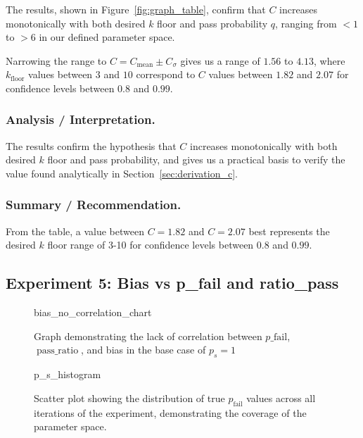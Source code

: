     The results, shown in Figure~\ref{fig:graph_table}, confirm that $C$ increases monotonically with both desired $k$ floor and pass probability $q$, ranging from $< 1$ to $> 6$ in our defined parameter space.

    Narrowing the range to $C = C_{\text{mean}} \pm C_{\sigma}$ gives us a range of $1.56$ to $4.13$, where $k_{\text{floor}}$ values between $3$ and $10$ correspond to $C$ values between $1.82$ and $2.07$ for confidence levels between $0.8$ and $0.99$.

    \subsubsection{Analysis / Interpretation.}

    The results confirm the hypothesis that $C$ increases monotonically with both desired $k$ floor and pass probability, and gives us a practical basis to verify the value found analytically in Section~\ref{sec:derivation_c}.

    \subsubsection{Summary / Recommendation.}

    From the table, a value between $C = 1.82$ and $C = 2.07$ best represents the desired $k$ floor range of 3-10 for confidence levels between $0.8$ and $0.99$.

\subsection{Experiment 5: Bias vs p\_fail and ratio\_pass}
\label{sec:ps_experiment1}

    \begin{figure}[ht!]
        \centering
        {bias_no_correlation_chart}
        \caption{Graph demonstrating the lack of correlation between $p\_\text{fail}$, $\operatorname{pass\_ratio}$, and bias in the base case of $p_s = 1$}
        \label{fig:ps_experiment1}
    \end{figure}

    \begin{figure}[ht!]
        \centering
        {p_s_histogram}
        \caption{Scatter plot showing the distribution of true $p_\text{fail} $ values across all iterations of the experiment, demonstrating the coverage of the parameter space.}
        \label{fig:ps_histogram}
    \end{figure}


